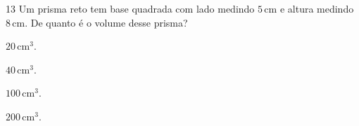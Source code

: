
\num{13} Um prisma reto tem base quadrada com lado medindo $5\,\text{cm}$ e altura
medindo $8\,\text{cm}$. De quanto é o volume desse prisma?

\begin{escolha}
\item $20\,\text{cm}^3$.
\item $40\,\text{cm}^3$.
\item $100\,\text{cm}^3$.
\item $200\,\text{cm}^3$.
\end{escolha}



